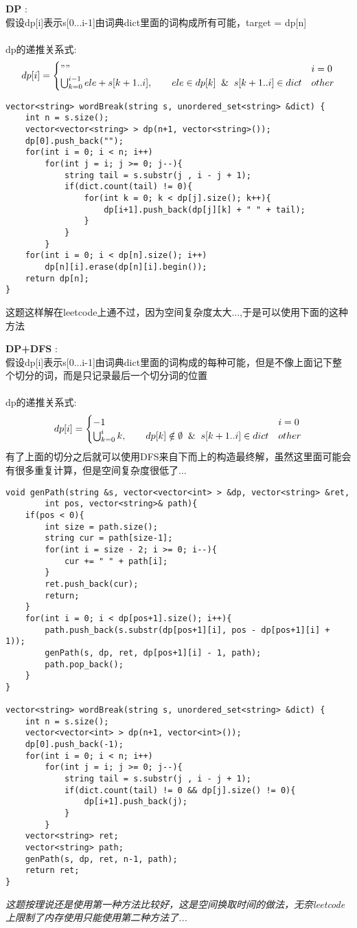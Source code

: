 \begin{description}
    \item{\textbf{DP}} : 
	\\假设dp[i]表示s[0...i-1]由词典dict里面的词构成所有可能，target = dp[n]\\
	\\dp的递推关系式:
$$
dp[i] =
\begin{cases} 
"" & i = 0 \\
\bigcup_{k=0}^{i-1}{ele + s[k+1..i], \qquad ele \in dp[k] \And s[k+1..i] \in dict} & other
\end{cases}
$$
    \begin{lstlisting}
vector<string> wordBreak(string s, unordered_set<string> &dict) {
	int n = s.size();
	vector<vector<string> > dp(n+1, vector<string>());
	dp[0].push_back("");
	for(int i = 0; i < n; i++)
		for(int j = i; j >= 0; j--){
			string tail = s.substr(j , i - j + 1);
			if(dict.count(tail) != 0){
				for(int k = 0; k < dp[j].size(); k++){
					dp[i+1].push_back(dp[j][k] + " " + tail);
				}
			}
		}
	for(int i = 0; i < dp[n].size(); i++)
		dp[n][i].erase(dp[n][i].begin());
	return dp[n];
}
    \end{lstlisting}
	这题这样解在leetcode上通不过，因为空间复杂度太大...,于是可以使用下面的这种方法
    \item{\textbf{DP+DFS}} : 
	\\假设dp[i]表示s[0...i-1]由词典dict里面的词构成的每种可能，但是不像上面记下整个切分的词，而是只记录最后一个切分词的位置\\
	\\dp的递推关系式:
$$
dp[i] =
\begin{cases} 
-1 & i = 0 \\
\bigcup_{k=0}^i{k,  \qquad dp[k] \notin \emptyset \And s[k+1..i] \in dict} & other
\end{cases}
$$
	有了上面的切分之后就可以使用DFS来自下而上的构造最终解，虽然这里面可能会有很多重复计算，但是空间复杂度很低了...
    \begin{lstlisting}
void genPath(string &s, vector<vector<int> > &dp, vector<string> &ret, 
		int pos, vector<string>& path){
	if(pos < 0){
		int size = path.size();
		string cur = path[size-1];
		for(int i = size - 2; i >= 0; i--){
			cur += " " + path[i];
		}
		ret.push_back(cur);
		return;
	}
	for(int i = 0; i < dp[pos+1].size(); i++){
		path.push_back(s.substr(dp[pos+1][i], pos - dp[pos+1][i] + 1));
		genPath(s, dp, ret, dp[pos+1][i] - 1, path);
		path.pop_back();
	}
}

vector<string> wordBreak(string s, unordered_set<string> &dict) {
	int n = s.size();
	vector<vector<int> > dp(n+1, vector<int>());
	dp[0].push_back(-1);
	for(int i = 0; i < n; i++)
		for(int j = i; j >= 0; j--){
			string tail = s.substr(j , i - j + 1);
			if(dict.count(tail) != 0 && dp[j].size() != 0){
				dp[i+1].push_back(j);
			}
		}
	vector<string> ret;
	vector<string> path;
	genPath(s, dp, ret, n-1, path);
	return ret;
}
    \end{lstlisting}
	\textit{这题按理说还是使用第一种方法比较好，这是空间换取时间的做法，无奈leetcode上限制了内存使用只能使用第二种方法了...}
\end{description}

